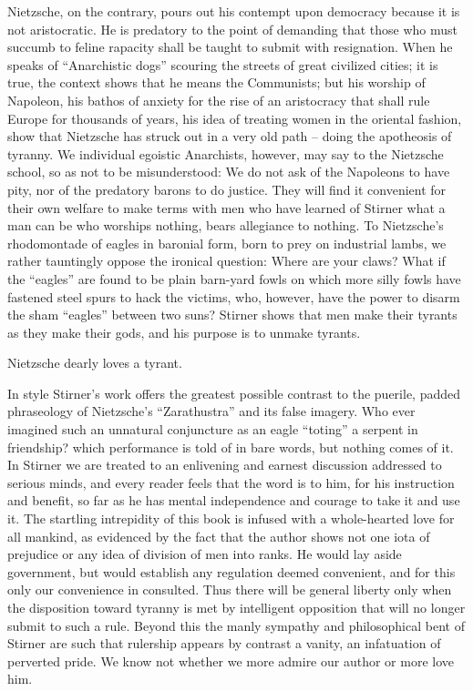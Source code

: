Nietzsche, on the contrary, pours out his contempt upon democracy because it 
is not aristocratic. He is predatory to the point of demanding that those who 
must succumb to feline rapacity shall be taught to submit with resignation. 
When he speaks of ``Anarchistic dogs'' scouring the streets of great 
civilized cities; it is true, the context shows that he means the Communists; 
but his worship of Napoleon, his bathos of anxiety for the rise of an 
aristocracy that shall rule Europe for thousands of years, his idea of 
treating women in the oriental fashion, show that Nietzsche has struck out in 
a very old path -- doing the apotheosis of tyranny. We individual egoistic 
Anarchists, however, may say to the Nietzsche school, so as not to be 
misunderstood: We do not ask of the Napoleons to have pity, nor of the 
predatory barons to do justice. They will find it convenient for their own 
welfare to make terms with men who have learned of Stirner what a man can be 
who worships nothing, bears allegiance to nothing. To Nietzsche's rhodomontade 
of eagles in baronial form, born to prey on industrial lambs, we rather 
tauntingly oppose the ironical question: Where are your claws? What if the 
``eagles'' are found to be plain barn-yard fowls on which more silly fowls 
have fastened steel spurs to hack the victims, who, however, have the power to 
disarm the sham ``eagles'' between two suns? Stirner shows that men make 
their tyrants as they make their gods, and his purpose is to unmake tyrants.

Nietzsche dearly loves a tyrant.

In style Stirner's work offers the greatest possible contrast to the puerile, 
padded phraseology of Nietzsche's ``Zarathustra'' and its false imagery. Who 
ever imagined such an unnatural conjuncture as an eagle ``toting'' a serpent 
in friendship? which performance is told of in bare words, but nothing comes 
of it. In Stirner we are treated to an enlivening and earnest discussion 
addressed to serious minds, and every reader feels that the word is to him, 
for his instruction and benefit, so far as he has mental independence and 
courage to take it and use it. The startling intrepidity of this book is 
infused with a whole-hearted love for all mankind, as evidenced by the fact 
that the author shows not one iota of prejudice or any idea of division of men 
into ranks. He would lay aside government, but would establish any regulation 
deemed convenient, and for this only our convenience in consulted. Thus there 
will be general liberty only when the disposition toward tyranny is met by 
intelligent opposition that will no longer submit to such a rule. Beyond this 
the manly sympathy and philosophical bent of Stirner are such that rulership 
appears by contrast a vanity, an infatuation of perverted pride. We know not 
whether we more admire our author or more love him.

